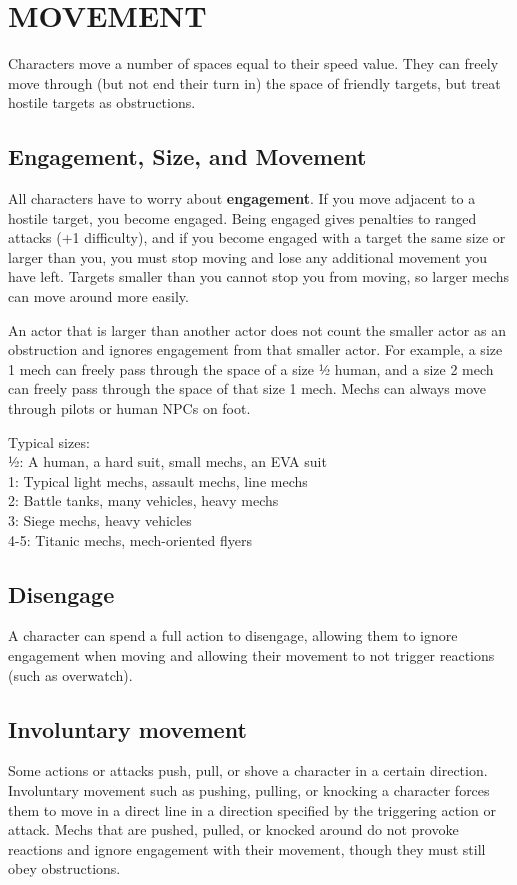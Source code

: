 \section{MOVEMENT}

Characters move a number of spaces equal to their speed value. They can freely move through (but not end their turn in) the space of friendly targets, but treat hostile targets as obstructions. 

\subsection{Engagement, Size, and Movement}

All characters have to worry about \textbf{engagement}. If you move adjacent to a hostile target, you become engaged. Being engaged gives penalties to ranged attacks (+1 difficulty), and if you become engaged with a target the same size or larger than you, you must stop moving and lose any additional movement you have left. Targets smaller than you cannot stop you from moving, so larger mechs can move around more easily.

An actor that is larger than another actor does not count the smaller actor as an obstruction and ignores engagement from that smaller actor. For example, a size 1 mech can freely pass through the space of a size ½ human, and a size 2 mech can freely pass through the space of that size 1 mech. Mechs can always move through pilots or human NPCs on foot.

Typical sizes:\\
½: A human, a hard suit, small mechs, an EVA suit\\
1: Typical light mechs, assault mechs, line mechs\\
2: Battle tanks, many vehicles, heavy mechs\\
3: Siege mechs, heavy vehicles\\
4-5: Titanic mechs, mech-oriented flyers

\subsection{Disengage}
A character can spend a full action to disengage, allowing them to ignore engagement when moving and allowing their movement to not trigger reactions (such as overwatch).

\subsection{Involuntary movement}
Some actions or attacks push, pull, or shove a character in a certain direction. Involuntary movement such as pushing, pulling, or knocking a character forces them to move in a direct line in a direction specified by the triggering action or attack. Mechs that are pushed, pulled, or knocked around do not provoke reactions and ignore engagement with their movement, though they must still obey obstructions.


